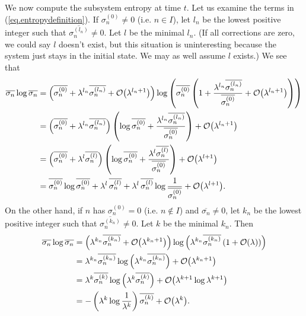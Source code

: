 We now compute the subsystem entropy at time \(t\). Let us examine the terms in (\ref{eq.entropydefinition}).
If \(\sigma_{n}^{(0)} \neq 0\) (i.e. \(n \in I\)), let \(l_n\) be the lowest positive integer such that \(\overline{\sigma_n^{(l_n)}} \neq 0\). Let \(l\) be the minimal \(l_n\). (If all corrections are zero, we could say \(l\) doesn't exist, but this situation is uninteresting because the system just stays in the initial state. We may as well assume \(l\) exists.) We see that
\begin{align*}
\overline{\sigma_n} \log \overline{\sigma_n}
&= \left(\overline{\sigma_n^{(0)}} + \lambda^{l_n} \overline{\sigma_n^{(l_n)}} + \mathcal{O}{\left(\lambda^{l_n+1}\right)}\right) \log \left(\overline{\sigma_n^{(0)}} \left(1 + \frac{\lambda^{l_n} \overline{\sigma_n^{(l_n)}}}{\overline{\sigma_n^{(0)}}}+ \mathcal{O}{\left(\lambda^{l_n+1}\right)}\right)\right) \\
&= \left(\overline{\sigma_n^{(0)}} + \lambda^{l_n} \overline{\sigma_n^{(l_n)}}\right) \left(\log \overline{\sigma_n^{(0)}} + \frac{\lambda^{l_n} \overline{\sigma_n^{(l_n)}}}{\overline{\sigma_n^{(0)}}}\right) + \mathcal{O}{\left(\lambda^{l_n+1}\right)}\\
&= \left(\overline{\sigma_n^{(0)}} + \lambda^{l} \overline{\sigma_n^{(l)}}\right) \left(\log \overline{\sigma_n^{(0)}} + \frac{\lambda^{l} \overline{\sigma_n^{(l)}}}{\overline{\sigma_n^{(0)}}}\right) + \mathcal{O}{\left(\lambda^{l+1}\right)}\\
&=  \overline{\sigma_n^{(0)}} \log \overline{\sigma_n^{(0)}} + \lambda^l\, \overline{\sigma_n^{(l)}} + \lambda^l\, \overline{\sigma_n^{(l)}}\log \frac{1}{\overline{\sigma_n^{(0)}}} + \mathcal{O}{\left(\lambda^{l+1}\right)}.
\end{align*}
On the other hand, if \(n\) has \(\sigma_{n}^{(0)} = 0\) (i.e. \(n \not\in I\)) and \(\overline{\sigma_n}\neq 0\), let \(k_n\) be the lowest positive integer such that \(\overline{\sigma_n^{(k_n)}} \neq 0\). Let \(k\) be the minimal \(k_n\). Then
\begin{align*}
\overline{\sigma_n} \log \overline{\sigma_n}
&= \left(\lambda^{k_n}\overline{\sigma_n^{(k_n)}} + \mathcal{O}{\left(\lambda^{k_n+1}\right)}\right) \log\left(\lambda^{k_n}\overline{\sigma_n^{(k_n)}}\left(1 + \mathcal{O}{\left(\lambda\right)}\right)\right) \\
&= \lambda^{k_n}\overline{\sigma_n^{(k_n)}} \log\left(\lambda^{k_n}\overline{\sigma_n^{(k_n)}}\right)+ \mathcal{O}{\left(\lambda^{k_n+1}\right)}\\
&= \lambda^{k}\overline{\sigma_n^{(k)}} \log\left(\lambda^{k}\overline{\sigma_n^{(k)}}\right)+ \mathcal{O}{\left(\lambda^{k+1}\log\lambda^{k+1}\right)} \\
&= -\left(\lambda^{k}\log\frac{1}{\lambda^k}\right)\overline{\sigma_n^{(k)}} + \mathcal{O}{\left(\lambda^{k}\right)}.
\end{align*}
